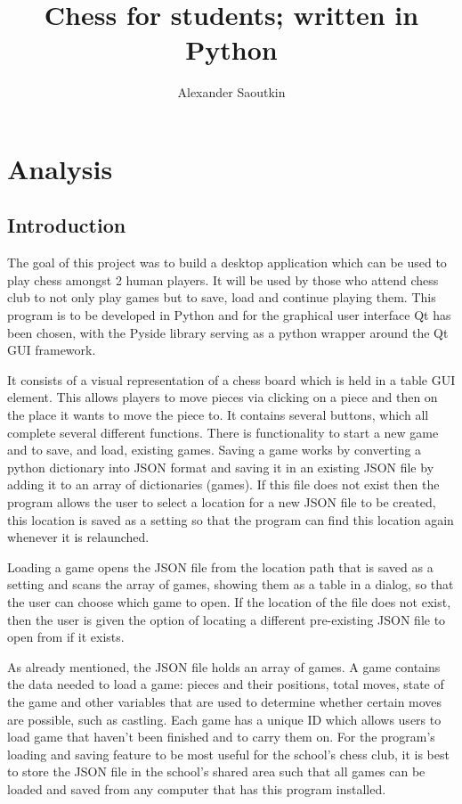 \documentclass[]{report}
\title{Chess for students; written in Python}
\author{Alexander Saoutkin}
\begin{document}
\maketitle
{}
\tableofcontents
\newpage
\chapter{Analysis}
\section{Introduction}
The goal of this project was to build a desktop application which can be used to play chess amongst 2 human players. It will be used by those who attend chess club to not only play games but to save, load and continue playing them. This program is to be developed in Python and for the graphical user interface Qt has been chosen, with the Pyside library serving as a python wrapper around the Qt GUI framework. 

It consists of a visual representation of a chess board which is held in a table GUI element. This allows players to move pieces via clicking on a piece and then on the place it wants to move the piece to. It contains several buttons, which all complete several different functions. There is functionality to start a new game and to save, and load, existing games. Saving a game works by converting a python dictionary into JSON format and saving it in an existing JSON file by adding it to an array of dictionaries (games). If this file does not exist then the program allows the user to select a location for a new JSON file to be created, this location is saved as a setting so that the program can find this location again whenever it is relaunched.
 
Loading a game opens the JSON file from the location path that is saved as a setting and scans the array of games, showing them as a table in a dialog, so that the user can choose which game to open. If the location of the file does not exist, then the user is given the option of locating a different pre-existing JSON file to open from if it exists.

As already mentioned, the JSON file holds an array of games. A game contains the data needed to load a game: pieces and their positions, total moves, state of the game and other variables that are used to determine whether certain moves are possible, such as castling. Each game has a unique ID which allows users to load game that haven't been finished and to carry them on. For the program's loading and saving feature to be most useful for the school's chess club, it is best to store the JSON file in the school's shared area such that all games can be loaded and saved from any computer that has this program installed.
\end{document}
